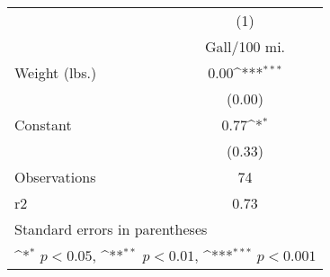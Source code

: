 {
\def\sym#1{\ifmmode^{#1}\else\(^{#1}\)\fi}
\begin{tabular}{l*{1}{c}}
\hline\hline
                    &\multicolumn{1}{c}{(1)}\\
                    &\multicolumn{1}{c}{Gall/100 mi.}\\
\hline
Weight (lbs.)       &        0.00\sym{***}\\
                    &      (0.00)         \\
[1em]
Constant            &        0.77\sym{*}  \\
                    &      (0.33)         \\
\hline
Observations        &          74         \\
r2                  &        0.73         \\
\hline\hline
\multicolumn{2}{l}{\footnotesize Standard errors in parentheses}\\
\multicolumn{2}{l}{\footnotesize \sym{*} \(p<0.05\), \sym{**} \(p<0.01\), \sym{***} \(p<0.001\)}\\
\end{tabular}
}
